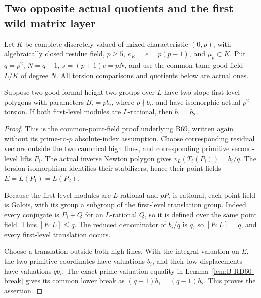 \subsection{Two opposite actual quotients and the first wild matrix layer}

Let \(K\) be complete discretely valued of mixed characteristic
\((0,p)\), with algebraically closed residue field,
\(p\ge5\), \(e_K=e=p(p-1)\), and \(\mu_p\subset K\).
Put \(q=p^2\), \(N=q-1\), \(s=(p+1)e=pN\), and use
the common tame good field \(L/K\) of degree \(N\).
All torsion comparisons and quotients below are actual ones.

\begin{lemma}
\label{lem:B-RD83-tame}
Suppose two good formal height-two groups over \(L\) have
two-slope first-level polygons with parameters \(B_i=pb_i\),
where \(p\nmid b_i\), and have isomorphic actual
\(p^2\)-torsion. If both first-level modules are
\(L\)-rational, then \(b_1=b_2\).
\end{lemma}
\begin{proof}
This is the common-point-field proof underlying B69, written
again without its prime-to-\(p\) absolute-index assumption.
Choose corresponding residual vectors outside the two
canonical high lines, and corresponding primitive
second-level lifts \(P_i\). The actual inverse Newton
polygon gives \(v_L(T_i(P_i))=b_i/q\). The torsion
isomorphism identifies their stabilizers, hence their
point fields \(E=L(P_1)=L(P_2)\).

Because the first-level modules are \(L\)-rational and
\(pP_i\) is rational, each point field is Galois, with
its group a subgroup of the first-level translation
group. Indeed every conjugate is \(P_i+Q\) for an
\(L\)-rational \(Q\), so it is defined over the same
point field. Thus \([E:L]\le q\). The reduced denominator
of \(b_i/q\) is \(q\), so \([E:L]=q\), and every
first-level translation occurs.

Choose a translation outside both high lines. With the
integral valuation on \(E\), the two primitive coordinates
have valuations \(b_i\), and their low displacements have
valuations \(qb_i\). The exact prime-valuation equality
in Lemma~\ref{lem:B-RD60-break} gives its common lower
break as \((q-1)b_1=(q-1)b_2\). This proves the assertion.
\end{proof}

